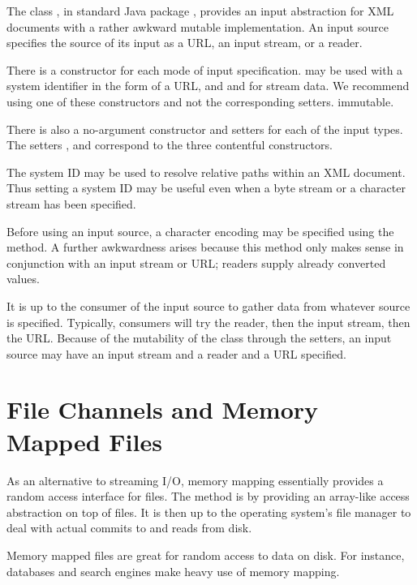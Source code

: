 The class , in standard Java package
, provides an input abstraction for XML documents
with a rather awkward mutable implementation.  An input source
specifies the source of its input as a URL, an input stream, or a
reader.

There is a constructor for each mode of input specification.
 may be used with a system identifier in the
form of a URL, and  and
 for stream data.  We recommend using one
of these constructors and not the corresponding setters.
immutable. 

There is also a no-argument constructor  and
setters for each of the input types.  The setters
,  and
 correspond to the three contentful
constructors.

The system ID may be used to resolve relative paths within an XML
document.  Thus setting a system ID may be useful even when a byte
stream or a character stream has been specified. 

Before using an input source, a character encoding may be specified
using the  method.  A further awkwardness
arises because this method only makes sense in conjunction with an
input stream or URL; readers supply already converted 
values.

It is up to the consumer of the input source to gather data from
whatever source is specified.  Typically, consumers will try the
reader, then the input stream, then the URL.  Because of the
mutability of the class through the setters, an input source may have
an input stream and a reader and a URL specified.






\section{File Channels and Memory Mapped Files}

As an alternative to streaming I/O, memory mapping essentially
provides a random access interface for files.  The method is by
providing an array-like access abstraction on top of files.  It is
then up to the operating system's file manager to deal with actual
commits to and reads from disk.

Memory mapped files are great for random access to data on disk.  For
instance, databases and search engines make heavy use of memory
mapping.

